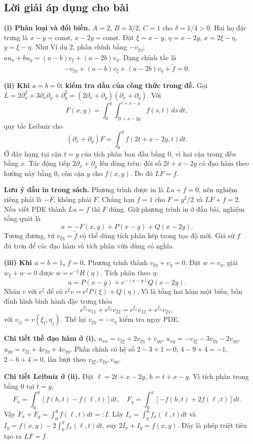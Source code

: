 \documentclass[10pt,a4paper]{article}
\begin{document}
\subsection*{Lời giải áp dụng cho bài}
\textbf{(i) Phân loại và đổi biến.} $A=2$, $B=3/2$, $C=1$ cho $\delta=1/4>0$. Hai họ đặc trưng là $x-y=\mathrm{const}$, $x-2y=\mathrm{const}$. Đặt $\xi=x-y$, $\eta=x-2y$, $x=2\xi-\eta$, $y=\xi-\eta$. Như Ví dụ 2, phần chính bằng $-v_{\xi\eta}$; $au_x+bu_y=(a-b)v_\xi+(a-2b)v_\eta$. Dạng chính tắc là
\[-v_{\xi\eta}+(a-b)v_\xi+(a-2b)v_\eta+\widetilde f=0.\]

\textbf{(ii) Khi $a=b=0$: kiểm tra dấu của công thức trong đề.} Gọi $L=2\partial_x^2+3\partial_x\partial_y+\partial_y^2=(2\partial_x+\partial_y)(\partial_x+\partial_y)$. Với
\[F(x,y)=\int_0^y\int_{2t+x-2y}^{t+x-y}f(s,t)\,ds\,dt,\]
quy tắc Leibniz cho
\[(\partial_x+\partial_y)F=\int_0^y f(2t+x-2y,t)dt.\]
Ở đây hạng tại cận $t=y$ của tích phân ban đầu bằng $0$, vì hai cận trong đều bằng $x$. Tác động tiếp $2\partial_x+\partial_y$ lên dòng trên: đối số $2t+x-2y$ có đạo hàm theo hướng này bằng $0$, còn cận $y$ cho $f(x,y)$. Do đó $LF=f$.

\textbf{Lưu ý dấu in trong sách.} Phương trình được in là $Lu+f=0$, nên nghiệm riêng phải là $-F$, không phải $F$. Chẳng hạn $f=1$ cho $F=y^2/2$ và $LF+f=2$. Nếu viết PDE thành $Lu=f$ thì $F$ đúng. Giữ phương trình in ở đầu bài, nghiệm tổng quát là
\[\boxed{u=-F(x,y)+P(x-y)+Q(x-2y).}\]
Tương đương, từ $v_{\xi\eta}=\widetilde f$ có thể dùng tích phân kép trong tọa độ mới. Giả sử $f$ đủ trơn để các đạo hàm và tích phân vừa dùng có nghĩa.

\textbf{(iii) Khi $a=b=1$, $f=0$.} Phương trình thành $v_{\xi\eta}+v_\eta=0$. Đặt $w=v_\eta$, giải $w_\xi+w=0$ được $w=e^{-\xi}H(\eta)$. Tích phân theo $\eta$:
\[\boxed{u=P(x-y)+e^{-(x-y)}Q(x-2y).}\]
Nhân $v$ với $e^\xi$ để có $e^\xi v=e^\xi P(\xi)+Q(\eta)$. Vì là tổng hai hàm một biến, bốn đỉnh hình bình hành đặc trưng thỏa
\[e^{\xi_1}v_{11}+e^{\xi_2}v_{22}=e^{\xi_1}v_{12}+e^{\xi_2}v_{21},\]
với $v_{ij}=v(\xi_i,\eta_j)$. Thế lại $v_{\xi\eta}=-v_\eta$ kiểm tra ngay PDE.

\textbf{Chi tiết thế đạo hàm ở (i).} $u_{xx}=v_{\xi\xi}+2v_{\xi\eta}+v_{\eta\eta}$, $u_{xy}=-v_{\xi\xi}-3v_{\xi\eta}-2v_{\eta\eta}$, $u_{yy}=v_{\xi\xi}+4v_{\xi\eta}+4v_{\eta\eta}$. Phần chính có hệ số $2-3+1=0$, $4-9+4=-1$, $2-6+4=0$, lần lượt theo $v_{\xi\xi},v_{\xi\eta},v_{\eta\eta}$.

\textbf{Chi tiết Leibniz ở (ii).} Đặt $\ell=2t+x-2y$, $h=t+x-y$. Vì tích phân trong bằng $0$ tại $t=y$,
\[F_x=\int_0^y[f(h,t)-f(\ell,t)]dt,\quad
F_y=\int_0^y[-f(h,t)+2f(\ell,t)]dt.\]
Vậy $F_x+F_y=\int_0^yf(\ell,t)dt=:I$. Lấy $I_x=\int_0^yf_x(\ell,t)dt$ và $I_y=f(x,y)-2\int_0^yf_x(\ell,t)dt$, suy $2I_x+I_y=f(x,y)$. Đây là phép triệt tiêu tạo ra $LF=f$.
\end{document}
